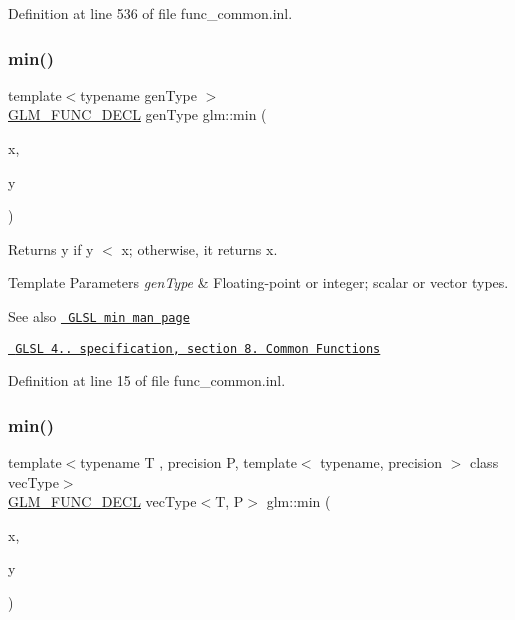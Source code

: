 Definition at line 536 of file func\+\_\+common.\+inl.

\mbox{\label{group__core__func__common_ga2c2bde1cec025b7ddff83c74a1113719}} 
\subsubsection{\texorpdfstring{min()}{min()}\hspace{0.1cm}{\footnotesize\ttfamily [1/3]}}
{\footnotesize\ttfamily template$<$typename gen\+Type $>$ \\
\mbox{\hyperlink{setup_8hpp_ab2d052de21a70539923e9bcbf6e83a51}{G\+L\+M\+\_\+\+F\+U\+N\+C\+\_\+\+D\+E\+CL}} gen\+Type glm\+::min (\begin{DoxyParamCaption}\item[{gen\+Type}]{x,  }\item[{gen\+Type}]{y }\end{DoxyParamCaption})}

Returns y if y $<$ x; otherwise, it returns x.


\begin{DoxyTemplParams}{Template Parameters}
{\em gen\+Type} & Floating-\/point or integer; scalar or vector types.\\
\hline
\end{DoxyTemplParams}
\begin{DoxySeeAlso}{See also}
\href{http://www.opengl.org/sdk/docs/manglsl/xhtml/min.xml}{\texttt{ G\+L\+SL min man page}} 

\href{http://www.opengl.org/registry/doc/GLSLangSpec.4.20.8.pdf}{\texttt{ G\+L\+SL 4.. specification, section 8. Common Functions}} 
\end{DoxySeeAlso}


Definition at line 15 of file func\+\_\+common.\+inl.

\mbox{\label{group__core__func__common_ga33e66cacf3e991ef1f7d0fce6d073ff9}} 
\subsubsection{\texorpdfstring{min()}{min()}\hspace{0.1cm}{\footnotesize\ttfamily [2/3]}}
{\footnotesize\ttfamily template$<$typename T , precision P, template$<$ typename, precision $>$ class vec\+Type$>$ \\
\mbox{\hyperlink{setup_8hpp_ab2d052de21a70539923e9bcbf6e83a51}{G\+L\+M\+\_\+\+F\+U\+N\+C\+\_\+\+D\+E\+CL}} vec\+Type$<$T, P$>$ glm\+::min (\begin{DoxyParamCaption}\item[{vec\+Type$<$ T, P $>$ const \&}]{x,  }\item[{T}]{y }\end{DoxyParamCaption})}



